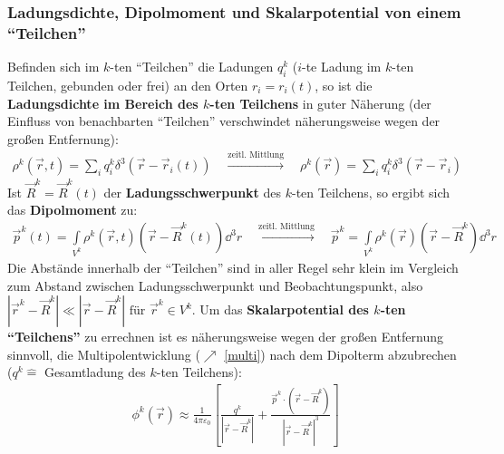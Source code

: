   \subsubsection{Ladungsdichte, Dipolmoment und Skalarpotential von einem \enquote{Teilchen}}
   Befinden sich im $k$-ten \enquote{Teilchen} die Ladungen  $q_i^k$ ($i$-te Ladung im $k$-ten Teilchen, gebunden oder frei) an den Orten $r_i = r_i(t)$, so ist die \textbf{Ladungsdichte im Bereich des $k$-ten Teilchens} in guter Näherung  (der Einfluss von benachbarten \enquote{Teilchen} verschwindet näherungsweise wegen der großen Entfernung):
		        \begin{equation}\begin{split}
				        \rho^k(\vec{r} , t) = \sum_i q_i^k \delta^3(\vec{r}  - \vec{r} _i(t) ) \quad \stackrel{\text{zeitl. Mittlung}}{\longrightarrow} \quad \boxed{\rho^k(\vec{r} ) = \sum_i q_i^k \delta^3(\vec{r}  - \vec{r} _i )}
			        \end{split}\end{equation}
		   Ist $\vec{R}^k=\vec{R}^k(t)$ der \textbf{Ladungsschwerpunkt} des $k$-ten Teilchens, so ergibt sich das \textbf{Dipolmoment} zu:
		        \begin{equation}\begin{split}
				        \vec{p}^k(t) = \int\limits_{V^k} \rho^k(\vec{r} , t) (\vec{r}  - \vec{R}^k(t) ) \dd^3r \quad \stackrel{\text{zeitl. Mittlung}}{\longrightarrow} \quad \boxed{\vec{p}^k = \int\limits_{V^k} \rho^k(\vec{r} ) (\vec{r}  - \vec{R}^k ) \dd^3r}
			        \end{split}\end{equation}
		  Die Abstände innerhalb der \enquote{Teilchen} sind in aller Regel sehr klein im Vergleich zum Abstand zwischen Ladungsschwerpunkt und Beobachtungspunkt, also $|\vec{r} ^k -  \vec{R}^k| \ll  |\vec{r}  - \vec{R}^k | \text{ für } \vec{r} ^k \in V^k $. Um das \textbf{Skalarpotential des $k$-ten \enquote{Teilchens}} zu errechnen ist es näherungsweise wegen der großen Entfernung sinnvoll, die Multipolentwicklung ($\nearrow$ \ref{multi}) nach dem Dipolterm abzubrechen ($q^k\hat{=}$ Gesamtladung des $k$-ten Teilchens):
		        \begin{equation}\begin{split}
				        \phi^k(\vec{r} ) \approx \frac{1}{4\pi\varepsilon_0} \left[ \frac{q^k}{|\vec{r}  - \vec{R}^k |} + \frac{\vec{p}^k \cdot (\vec{r}  - \vec{R}^k )}{|\vec{r}  - \vec{R}^k |^3} \right]
			        \end{split}\end{equation}
